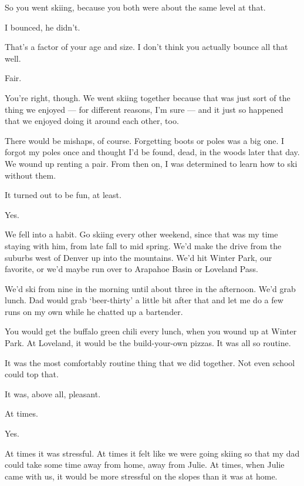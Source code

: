 \begin{paracol}{2}
\begin{leftcolumn}
\begin{ally}
So you went skiing, because you both were about the same level at that.
\end{ally}
I bounced, he didn't.

\begin{ally}
That's a factor of your age and size. I don't think you actually bounce all that well.
\end{ally}
Fair.

You're right, though. We went skiing together because that was just sort of the thing we enjoyed --- for different reasons, I'm sure --- and it just so happened that we enjoyed doing it around each other, too.

There would be mishaps, of course. Forgetting boots or poles was a big one. I forgot my poles once and thought I'd be found, dead, in the woods later that day. We wound up renting a pair. From then on, I was determined to learn how to ski without them.

\begin{ally}
It turned out to be fun, at least.
\end{ally}
Yes.

We fell into a habit. Go skiing every other weekend, since that was my time staying with him, from late fall to mid spring. We'd make the drive from the suburbs west of Denver up into the mountains. We'd hit Winter Park, our favorite, or we'd maybe run over to Arapahoe Basin or Loveland Pass.

We'd ski from nine in the morning until about three in the afternoon. We'd grab lunch. Dad would grab `beer-thirty' a little bit after that and let me do a few runs on my own while he chatted up a bartender.

\begin{ally}
You would get the buffalo green chili every lunch, when you wound up at Winter Park. At Loveland, it would be the build-your-own pizzas. It was all so routine.
\end{ally}
It was the most comfortably routine thing that we did together. Not even school could top that.

\begin{ally}
It was, above all, pleasant.
\end{ally}
At times.

\begin{ally}
Yes.
\end{ally}
At times it was stressful. At times it felt like we were going skiing so that my dad could take some time away from home, away from Julie. At times, when Julie came with us, it would be more stressful on the slopes than it was at home.


\end{leftcolumn}
\end{paracol}
